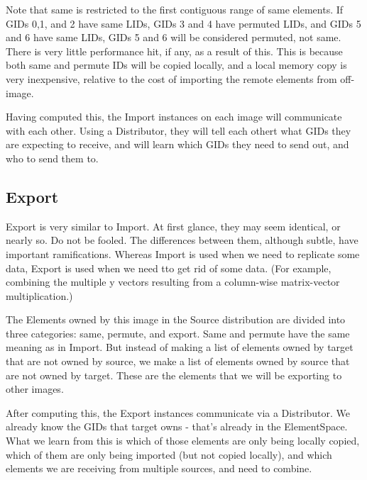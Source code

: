 \documentclass[10pt,relax]{TpetraDesign}
\begin{document}
Note that same is restricted to the first contiguous range of same elements. If GIDs 0,1, and 2 have same LIDs, GIDs 3 and 4 have permuted LIDs, and GIDs 5 and 6 have same LIDs, GIDs 5 and 6 will be considered permuted, not same. There is very little performance hit, if any, as a result of this. This is because both same and permute IDs will be copied locally, and a local memory copy is very inexpensive, relative to the cost of importing the remote elements from off-image.

Having computed this, the Import instances on each image will communicate with each other. Using a Distributor, they will tell each othert what GIDs they are expecting to receive, and will learn which GIDs they need to send out, and who to send them to.


%
\subsection{Export}

Export is very similar to Import. At first glance, they may seem identical, or nearly so. Do not be fooled. The differences between them, although subtle, have important ramifications. Whereas Import is used when we need to replicate some data, Export is used when we need tto get rid of some data. (For example, combining the multiple y vectors resulting from a column-wise matrix-vector multiplication.)

The Elements owned by this image in the Source distribution are divided into three categories: same, permute, and export. Same and permute have the same meaning as in Import. But instead of making a list of elements owned by target that are not owned by source, we make a list of elements owned by source that are not owned by target. These are the elements that we will be exporting to other images.

After computing this, the Export instances communicate via a Distributor. We already know the GIDs that target owns - that's already in the ElementSpace. What we learn from this is which of those elements are only being locally copied, which of them are only being imported (but not copied locally), and which elements we are receiving from multiple sources, and need to combine.

\end{document}
